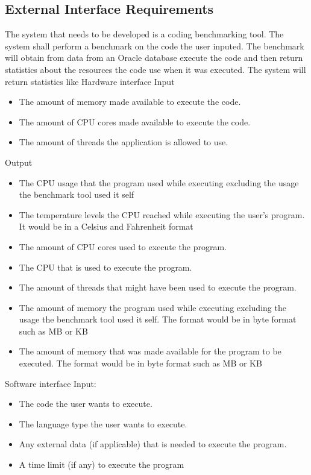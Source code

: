\documentclass[a4paper,12pt]{article}
\begin{document}
\subsection{External Interface Requirements}
The system that needs to be developed is a coding benchmarking tool. The system shall perform a benchmark on the code the user inputed. The benchmark will obtain from data from an Oracle database execute the code and then return statistics about the resources the code use when it was executed. The system will return statistics like
Hardware interface
Input
\begin{itemize}
\item The amount of memory made available to execute the code.
\item The amount of CPU cores made available to execute the code. 
\item The amount of threads the application is allowed to use.
\end{itemize}
Output
\begin{itemize}
\item The CPU usage that the program used while executing excluding the usage the benchmark tool used it self
\item The temperature levels the CPU reached while executing the user's program. It would be in a Celsius and Fahrenheit format
\item The amount of CPU cores used to execute the program.
\item The CPU that is used to execute the program. 
\item The amount of threads that might have been used to execute the program. 
\item The amount of memory the program used while executing excluding the usage the benchmark tool used it self. The format would be in byte format such as MB or KB
\item The amount of memory that was made available for the program to be executed. The format would be in byte format such as MB or KB
\end{itemize}
Software interface
Input:
\begin{itemize}
\item The code the user wants to execute.
\item The language type the user wants to execute.
\item Any external  data (if applicable) that is needed to execute the program.
\item A time limit (if any) to execute the program
\end{itemize}
\end{document}
